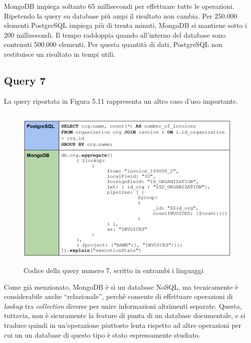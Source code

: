\noindent MongoDB impiega soltanto 65 millisecondi per effettuare tutte le operazioni.\\
Ripetendo la query su database più ampi il risultato non cambia. Per 250.000 elementi PostgreSQL impiega più di trenta minuti, MongoDB si mantiene sotto i 200 millisecondi. Il tempo raddoppia quando all'interno del database sono contenuti 500.000 elementi. Per questa quantità di dati, PostgreSQL non restituisce un risultato in tempi utili.\\


\subsection{Query 7}
La query riportata in Figura 5.11 rappresenta un altro caso d'uso importante.

\begin{figure}[htbp]
\begin{center}
\includegraphics[height=22em]{immagini/query/query7.png}
\caption{Codice della query numero 7, scritto in entrambi i linguaggi}
\end{center}
\end{figure}

\noindent Come già menzionato, MongoDB è sì un database NoSQL, ma tecnicamente è considerabile anche ``relazionale'', perchè consente di effettuare operazioni di \textit{lookup} tra \textit{collection} diverse per unire informazioni altrimenti separate. Questa, tuttavia, non è sicuramente la feature di punta di un database documentale, e si traduce quindi in un'operazione piuttosto lenta rispetto ad altre operazioni per cui un un database di questo tipo è stato espressamente studiato.\\

